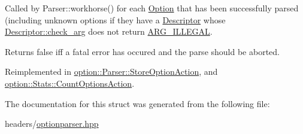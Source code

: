 Called by Parser\+::workhorse() for each \hyperlink{classoption_1_1Option}{Option} that has been successfully parsed (including unknown options if they have a \hyperlink{structoption_1_1Descriptor}{Descriptor} whose \hyperlink{structoption_1_1Descriptor_aa5d675dba0214a4abd73007ff163cc67}{Descriptor\+::check\+\_\+arg} does not return \hyperlink{namespaceoption_aee8c76a07877335762631491e7a5a1a9a9528e32563b795bd2930b12d0a5e382d}{A\+R\+G\+\_\+\+I\+L\+L\+E\+G\+AL}. 

Returns {\ttfamily false} iff a fatal error has occured and the parse should be aborted. 

Reimplemented in \hyperlink{classoption_1_1Parser_1_1StoreOptionAction_a8931919fba5516377c202920db2b2f84}{option\+::\+Parser\+::\+Store\+Option\+Action}, and \hyperlink{classoption_1_1Stats_1_1CountOptionsAction_a29ab8a68d0a30736b99b4d2e5dece489}{option\+::\+Stats\+::\+Count\+Options\+Action}.



The documentation for this struct was generated from the following file\+:\begin{DoxyCompactItemize}
\item 
headers/\hyperlink{optionparser_8hpp}{optionparser.\+hpp}\end{DoxyCompactItemize}
